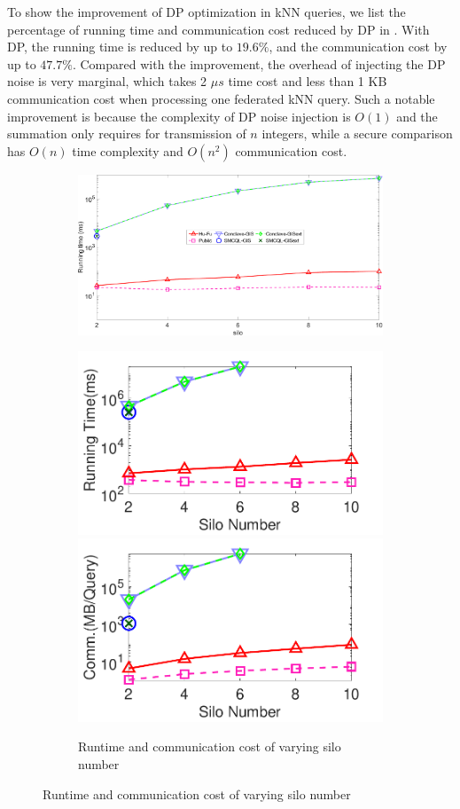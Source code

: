 To show the improvement of DP optimization in kNN queries, 
we list the percentage of running time and communication cost reduced by DP in . 
With DP, the running time is reduced by up to $19.6\%$, and the communication cost by up to $47.7\%$.
Compared with the improvement, the overhead of injecting the DP noise is very marginal,
which takes 2 $\mu s$ time cost and less than 1 KB communication cost when processing one federated kNN query. Such a notable improvement is because the complexity of DP noise injection is $O(1)$ and the summation only requires for transmission of $n$ integers, 
while a secure comparison has $O(n)$ time complexity and $O(n^2)$ communication cost.

\begin{figure}[t]
    \centering
    \begin{subfigure}{0.30\textwidth}
        \centering
        \includegraphics[width=\textwidth]{legend.pdf}
    \end{subfigure}
    \begin{subfigure}{0.48\textwidth}
        \includegraphics[width=0.48\linewidth]{knnjoin_silo_time.pdf}
        \includegraphics[width=0.48\linewidth]{knnjoin_silo_cost.pdf}
        \caption{Runtime and communication cost of varying silo number}
        \label{fig:knn-join-eff-silo}
    \end{subfigure}


\end{figure}
